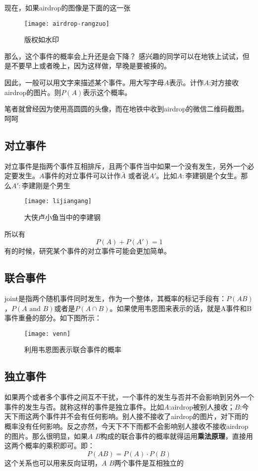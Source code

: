 现在，如果airdrop的图像是下面的这一张
\begin{figure}[H]
\centering
\texttt{[image: airdrop-rangzuo]}
\caption{版权如水印}
\end{figure}
那么，这个事件的概率会上升还是会下降？
感兴趣的同学可以在地铁上试试，但是不要早上或者晚上，因为这样做，早晚是要被揍的。

因此，一般可以用文字来描述某个事件。用大写字母$A$表示。计作$A$:对方接收airdrop的图片。则$P(A)$表示这个概率。

笔者就曾经因为使用高圆圆的头像，而在地铁中收到airdrop的微信二维码截图。呵呵

\subsection*{对立事件}
对立事件是指两个事件互相排斥，且两个事件当中如果一个没有发生，另外一个必定要发生。$A$事件的对立事件可以计作$\bar{A}$ 或者说$A'$。比如$A:$李建钢是个女生。那么$A':$李建刚是个男生
\begin{figure}[H]
\centering
\texttt{[image: lijiangang]}
\caption{大侠卢小鱼当中的李建钢}
\end{figure}

所以有
\[
	P(A)+P(A')=1
\]
有的时候，研究某个事件的对立事件可能会更加简单。


\subsection*{联合事件}
\gls{joint}是指两个随机事件同时发生，作为一个整体，其概率的标记手段有：$P(AB)$，$P(A \text{ and }B)$或者是$P(A\cap B)$。如果使用韦恩图来表示的话，就是A事件和B事件重叠的部分。如下图所示：
\begin{figure}[H]
\centering
\texttt{[image: venn]}
\label{fig:venn}
\caption{利用韦恩图表示联合事件的概率}
\end{figure}

\subsection*{独立事件}
如果两个或者多个事件之间互不干扰，一个事件的发生与否并不会影响到另外一个事件的发生与否。就称这样的事件是独立事件。比如$A$:airdrop被别人接收；$B$:今天下雨这两个事件并不会有任何影响。别人接不接收了airdrop的图片，对下雨的概率没有任何影响。反之亦然，今天下不下雨都不会影响别人接收不接收airdrop的图片。那么很明显，如果$A$ $B$构成的联合事件的概率就得运用\textbf{乘法原理}，直接用这两个概率的乘积即可。即：
\[
	P(AB) = P(A) \cdot P(B)
\]
这个关系也可以用来反向证明，$A$ $B$两个事件是互相独立的

